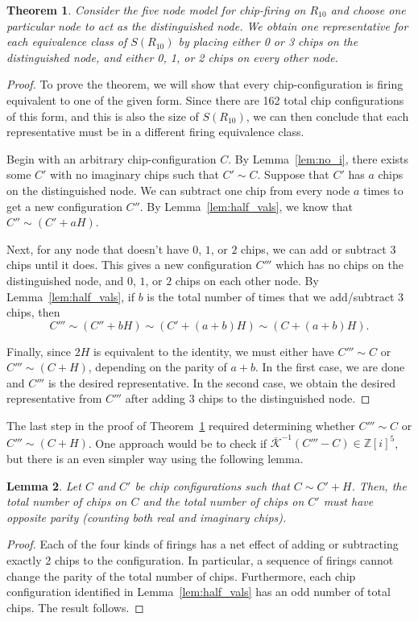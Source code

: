 \documentclass[12p]{amsart}
\numberwithin{equation}{section}
\theoremstyle{plain}
\newtheorem{thm}{Theorem}[section]
\newtheorem{lemma}[thm]{Lemma}
\theoremstyle{definition}
\begin{document}
\begin{thm}\label{thm:representatives}
    Consider the five node model for chip-firing on $R_{10}$ and choose one particular node to act as \emph{the distinguished node}. We obtain one representative for each equivalence class of $S(R_{10})$ by placing either 0 or 3 chips on the distinguished node, and either 0, 1, or 2 chips on every other node. 
\end{thm}
\begin{proof}
    To prove the theorem, we will show that every chip-configuration is firing equivalent to one of the given form. Since there are 162 total chip configurations of this form, and this is also the size of $S(R_{10})$, we can then conclude that each representative must be in a different firing equivalence class.
    
    Begin with an arbitrary chip-configuration $C$. By Lemma~\ref{lem:no_i}, there exists some $C'$ with no imaginary chips such that $C' \sim C$. Suppose that $C'$ has $a$ chips on the distinguished node. We can subtract one chip from every node $a$ times to get a new configuration $C''$. By Lemma~\ref{lem:half_vals}, we know that $C'' \sim (C' + aH)$. 

    Next, for any node that doesn't have $0$, $1$, or $2$ chips, we can add or subtract 3 chips until it does. This gives a new configuration $C'''$ which has no chips on the distinguished node, and $0$, $1$, or $2$ chips on each other node. By Lemma~\ref{lem:half_vals}, if $b$ is the total number of times that we add/subtract $3$ chips, then \[C''' \sim (C'' + bH) \sim (C' + (a+b)H) \sim (C + (a+b)H).\]

    Finally, since $2H$ is equivalent to the identity, we must either have $C''' \sim C$ or $C''' \sim (C + H)$, depending on the parity of $a+b$. In the first case, we are done and $C'''$ is the desired representative. In the second case, we obtain the desired representative from $C'''$ after adding $3$ chips to the distinguished node. 
\end{proof}

The last step in the proof of Theorem~\ref{thm:representatives} required determining whether $C''' \sim C$ or $C''' \sim (C + H)$. One approach would be to check if $\overline{\mathcal K}^{-1}(C''' - C) \in \mathbb Z[i]^5$, but there is an even simpler way using the following lemma. 

\begin{lemma}\label{lem:parity}
    Let $C$ and $C'$ be chip configurations such that $C \sim C' + H$. Then, the total number of chips on $C$ and the total number of chips on $C'$ must have opposite parity (counting both real and imaginary chips). 
\end{lemma}
\begin{proof}
    Each of the four kinds of firings has a net effect of adding or subtracting exactly 2 chips to the configuration. In particular, a sequence of firings cannot change the parity of the total number of chips. Furthermore, each chip configuration identified in Lemma~\ref{lem:half_vals} has an odd number of total chips. The result follows. 
\end{proof}
\end{document}
